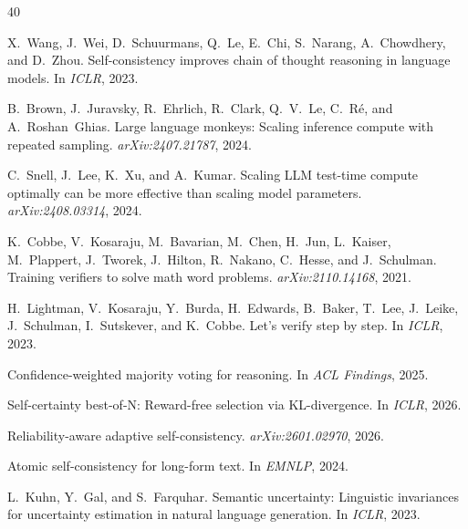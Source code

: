 \documentclass[11pt,a4paper]{article}
\begin{document}
\begingroup
\small
\begin{thebibliography}{40}

X.~Wang, J.~Wei, D.~Schuurmans, Q.~Le, E.~Chi, S.~Narang, A.~Chowdhery, and D.~Zhou.
\newblock Self-consistency improves chain of thought reasoning in language models.
\newblock In \emph{ICLR}, 2023.

B.~Brown, J.~Juravsky, R.~Ehrlich, R.~Clark, Q.~V.~Le, C.~R\'{e}, and A.~Roshan~Ghias.
\newblock Large language monkeys: Scaling inference compute with repeated sampling.
\newblock \emph{arXiv:2407.21787}, 2024.

C.~Snell, J.~Lee, K.~Xu, and A.~Kumar.
\newblock Scaling {LLM} test-time compute optimally can be more effective than scaling model parameters.
\newblock \emph{arXiv:2408.03314}, 2024.

K.~Cobbe, V.~Kosaraju, M.~Bavarian, M.~Chen, H.~Jun, L.~Kaiser, M.~Plappert, J.~Tworek, J.~Hilton, R.~Nakano, C.~Hesse, and J.~Schulman.
\newblock Training verifiers to solve math word problems.
\newblock \emph{arXiv:2110.14168}, 2021.

H.~Lightman, V.~Kosaraju, Y.~Burda, H.~Edwards, B.~Baker, T.~Lee, J.~Leike, J.~Schulman, I.~Sutskever, and K.~Cobbe.
\newblock Let's verify step by step.
\newblock In \emph{ICLR}, 2023.

Confidence-weighted majority voting for reasoning.
\newblock In \emph{ACL Findings}, 2025.

Self-certainty best-of-{N}: Reward-free selection via {KL}-divergence.
\newblock In \emph{ICLR}, 2026.

Reliability-aware adaptive self-consistency.
\newblock \emph{arXiv:2601.02970}, 2026.

Atomic self-consistency for long-form text.
\newblock In \emph{EMNLP}, 2024.

L.~Kuhn, Y.~Gal, and S.~Farquhar.
\newblock Semantic uncertainty: Linguistic invariances for uncertainty estimation in natural language generation.
\newblock In \emph{ICLR}, 2023.


\end{thebibliography}
\end{document}
